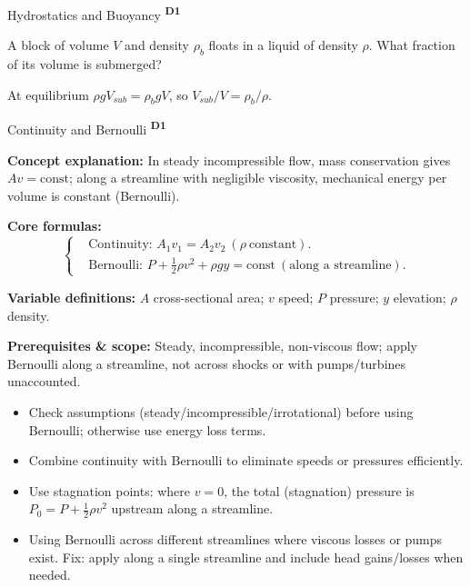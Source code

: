 ﻿\documentclass[12pt,a4paper]{article}
\providecommand{\KPFormulas}{}
\providecommand{\KPHeuristics}{}
\providecommand{\KPProblems}{}
\newcommand{\DOne}{\texorpdfstring{\textsuperscript{\textbf{D1}}}{ D1}}
\begin{document}
\begin{KnowledgePoint}{Hydrostatics and Buoyancy \DOne}
  \KPProblems
\begin{cheatproblem}
  A block of volume $V$ and density $\rho_b$ floats in a liquid of density $\rho$. What fraction of its volume is submerged?
  \begin{solutionbox}
  At equilibrium $\rho g V_{sub}=\rho_b g V$, so $V_{sub}/V=\rho_b/\rho$.
  \end{solutionbox}
  \end{cheatproblem}
\end{KnowledgePoint}

\begin{KnowledgePoint}{Continuity and Bernoulli \DOne}
  \KPFormulas
  \begin{formulabox}
  \textbf{Concept explanation:} In steady incompressible flow, mass conservation gives $Av=\text{const}$; along a streamline with negligible viscosity, mechanical energy per volume is constant (Bernoulli).

  \textbf{Core formulas:}
  \[
  \left\{\begin{aligned}
    &\text{Continuity: } A_1 v_1=A_2 v_2\ (\rho \ \text{constant}).\\
    &\text{Bernoulli: } P+\tfrac12\rho v^2+\rho g y=\text{const}\ (\text{along a streamline}).
  \end{aligned}\right.
  \]

  \textbf{Variable definitions:} $A$ cross-sectional area; $v$ speed; $P$ pressure; $y$ elevation; $\rho$ density.

  

  \textbf{Prerequisites \& scope:} Steady, incompressible, non-viscous flow; apply Bernoulli along a streamline, not across shocks or with pumps/turbines unaccounted.
  \end{formulabox}

  \KPHeuristics
  \begin{heuristicsbox}
  \begin{itemize}[leftmargin=*]
    \item Check assumptions (steady/incompressible/irrotational) before using Bernoulli; otherwise use energy loss terms.
    \item Combine continuity with Bernoulli to eliminate speeds or pressures efficiently.
  \item Use stagnation points: where $v=0$, the total (stagnation) pressure is $P_0=P+\tfrac12\rho v^2$ upstream along a streamline.
  \end{itemize}
  \vspace{0.4em}
  \begin{itemize}[leftmargin=*]
    \item Using Bernoulli across different streamlines where viscous losses or pumps exist. Fix: apply along a single streamline and include head gains/losses when needed.
  \end{itemize}
  \end{heuristicsbox}


\end{KnowledgePoint}
\end{document}
